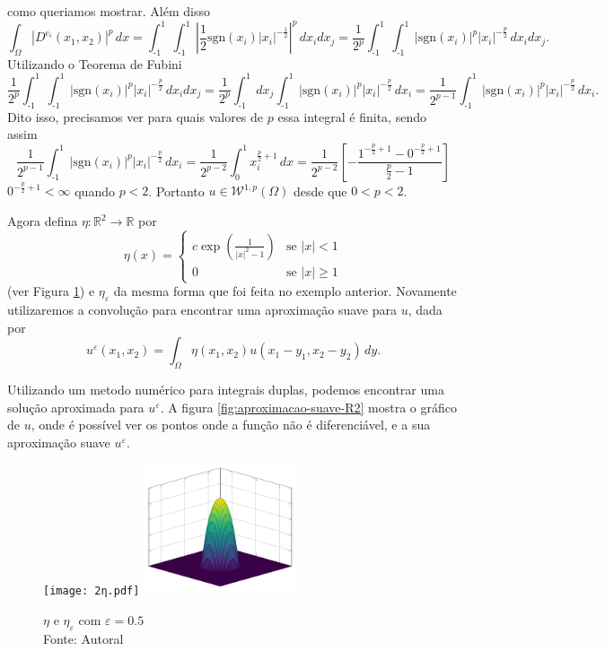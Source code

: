\documentclass[a4paper, 11pt]{book}
\theoremstyle{definition}
\newcommand{\bR}{\mathbb{R}}
\newcommand{\cW}{\mathcal{W}}
\newcommand{\sgn}{\mathrm{sgn}}
\begin{document}
\begin{ex}
\[    \]
    como queriamos mostrar.
    Além disso
    \[
        \int_\Omega |D^{e_i} (x_1,x_2)|^p \, dx = \int_{\text{-}1}^1 \int_{\text{-}1}^1 \left| \frac{1}{2} \sgn(x_i) |x_i|^{-\frac{1}{2}} \right|^p \, dx_i dx_j = \frac{1}{2^p}\int_{\text{-}1}^1 \int_{\text{-}1}^1 |\sgn(x_i)|^p |x_i|^{-\frac{p}{2}} \,dx_i dx_j.
    \]
    Utilizando o Teorema de Fubini
    {\small
    \[
        \frac{1}{2^p}\int_{\text{-}1}^1\int_{\text{-}1}^1 |\sgn(x_i)|^p |x_i|^{-\frac{p}{2}} \,dx_i dx_j = \frac{1}{2^p}\int_{\text{-}1}^1 dx_j \int_{\text{-}1}^1 |\sgn(x_i)|^p |x_i|^{-\frac{p}{2}} \,dx_i = \frac{1}{2^{p-1}} \int_{\text{-}1}^1 |\sgn(x_i)|^p |x_i|^{-\frac{p}{2}} \,dx_i.
    \]}\!
    Dito isso, precisamos ver para quais valores de $p$ essa integral é finita, sendo assim
    \[
        \frac{1}{2^{p-1}} \int_{\text{-}1}^1 |\sgn(x_i)|^p |x_i|^{-\frac{p}{2}} \,dx_i = \frac{1}{2^{p-2}}\int_0^1 x_i^{\frac{p}{2}+1} \,dx = \frac{1}{2^{p-2}} \left[ -\frac{1^{-\frac{p}{2}+1} - 0^{-\frac{p}{2}+1}}{\tfrac{p}{2} - 1} \right]
    \]
    $0^{-\frac{p}{2} + 1} < \infty$ quando $p < 2$. Portanto $u \in \cW^{1,p}(\Omega)$ desde que $0 < p < 2$.

    Agora defina $\eta: \bR^2 \to \bR$ por
    \[
        \eta(x) = 
        \left\{ 
            \begin{array}{lr}
                c \exp\left(\frac{1}{|x|^2 - 1} \right) & \text{se } |x| < 1\\
                0 & \text{se } |x| \geqslant 1
            \end{array}
        \right.
    \]
    (ver Figura \ref{fig:eta-R2}) e $\eta_\varepsilon$ da mesma forma que foi feita no exemplo anterior. Novamente utilizaremos a convolução para encontrar uma aproximação suave para $u$, dada por
    \[
        u^{\varepsilon}(x_1,x_2) = \int_\Omega \eta(x_1,x_2) u(x_1 - y_1, x_2 - y_2) \,dy.
    \]

    Utilizando um metodo numérico para integrais duplas, podemos encontrar uma solução aproximada para $u^\varepsilon$.
    A figura \ref{fig:aproximacao-suave-R2} mostra o gráfico de $u$, onde é possível ver os pontos onde a função não é diferenciável, e a sua aproximação suave $u^\varepsilon$.

    \begin{figure}
        \centering
        \texttt{[image: 2η.pdf]}
        \hspace{10mm}
        \includegraphics[width=0.4\textwidth]{2ηε.pdf}
        \caption{$\eta$ e $\eta_\varepsilon$ com $\varepsilon = 0.5$\\Fonte: Autoral}
        \label{fig:eta-R2}
    \end{figure}


\end{ex}
\end{document}
